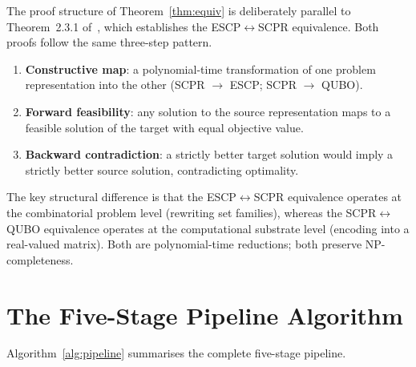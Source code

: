 \documentclass[11pt,a4paper]{article}
\theoremstyle{plain}
\theoremstyle{definition}
\theoremstyle{remark}
\newcommand{\SCPR}{\textup{SCPR}}
\newcommand{\QUBO}{\textup{QUBO}}
\newcommand{\ESCP}{\textup{ESCP}}
\begin{document}
The proof structure of Theorem~\ref{thm:equiv} is deliberately parallel to
Theorem~2.3.1 of~\cite{babatunde2025thesis}, which establishes the
\ESCP{}$\leftrightarrow$\SCPR{} equivalence.
Both proofs follow the same three-step pattern.

\begin{enumerate}[leftmargin=*, label=\arabic*.]
  \item \textbf{Constructive map}: a polynomial-time transformation of one problem
        representation into the other (\SCPR{} $\to$ \ESCP{}; \SCPR{} $\to$ \QUBO{}).

  \item \textbf{Forward feasibility}: any solution to the source representation maps
        to a feasible solution of the target with equal objective value.

  \item \textbf{Backward contradiction}: a strictly better target solution would imply
        a strictly better source solution, contradicting optimality.
\end{enumerate}

The key structural difference is that the \ESCP{}$\leftrightarrow$\SCPR{} equivalence
operates at the combinatorial problem level (rewriting set families), whereas the
\SCPR{}$\leftrightarrow$\QUBO{} equivalence operates at the computational substrate
level (encoding into a real-valued matrix).
Both are polynomial-time reductions; both preserve NP-completeness.

\section{The Five-Stage Pipeline Algorithm}
\label{sec:algorithm}

Algorithm~\ref{alg:pipeline} summarises the complete five-stage pipeline.
\end{document}
